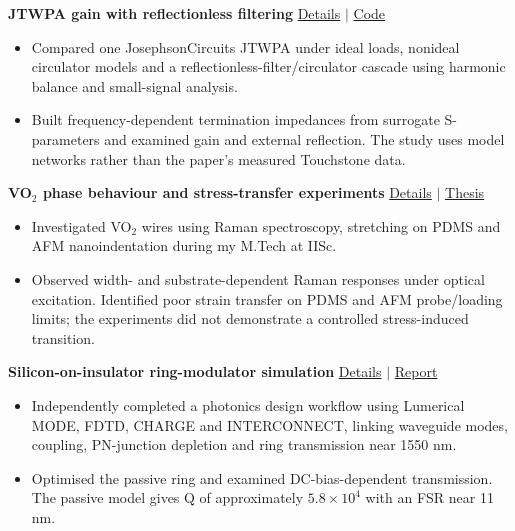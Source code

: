 \documentclass[margin,line]{resume}
\newcommand{\projectlink}[2]{\href{https://mukul-quantum-researcher.github.io/projects/#1/}{#2}}
\begin{document}
\begin{resume}
\begin{minipage}{\linewidth}
\textbf{JTWPA gain with reflectionless filtering} \hfill \projectlink{reflectionless-filter}{Details} $\vert$ \href{https://github.com/Mukul-Quantum-Researcher/reflectionless-filter-jtwpa}{Code}
\begin{itemize}
\item Compared one JosephsonCircuits JTWPA under ideal loads, nonideal circulator models and a reflectionless-filter/circulator cascade using harmonic balance and small-signal analysis.
\item Built frequency-dependent termination impedances from surrogate S-parameters and examined gain and external reflection. The study uses model networks rather than the paper's measured Touchstone data.
\end{itemize}
\end{minipage}\par\vspace{3pt}

\begin{minipage}{\linewidth}
\textbf{VO$_2$ phase behaviour and stress-transfer experiments} \hfill \projectlink{vo2-thesis}{Details} $\vert$ \href{https://mukul-quantum-researcher.github.io/assets/documents/Mukul-VO2-Thesis.pdf}{Thesis}
\begin{itemize}
\item Investigated VO$_2$ wires using Raman spectroscopy, stretching on PDMS and AFM nanoindentation during my M.Tech at IISc.
\item Observed width- and substrate-dependent Raman responses under optical excitation. Identified poor strain transfer on PDMS and AFM probe/loading limits; the experiments did not demonstrate a controlled stress-induced transition.
\end{itemize}
\end{minipage}\par\vspace{3pt}

\begin{minipage}{\linewidth}
\textbf{Silicon-on-insulator ring-modulator simulation} \hfill \projectlink{ring-modulator}{Details} $\vert$ \href{https://mukul-quantum-researcher.github.io/assets/documents/Mukul-Ring-Modulator-Report.pdf}{Report}
\begin{itemize}
\item Independently completed a photonics design workflow using Lumerical MODE, FDTD, CHARGE and INTERCONNECT, linking waveguide modes, coupling, PN-junction depletion and ring transmission near 1550 nm.
\item Optimised the passive ring and examined DC-bias-dependent transmission. The passive model gives Q of approximately $5.8\times10^4$ with an FSR near 11 nm.
\end{itemize}
\end{minipage}\par\vspace{3pt}


\end{resume}
\end{document}
